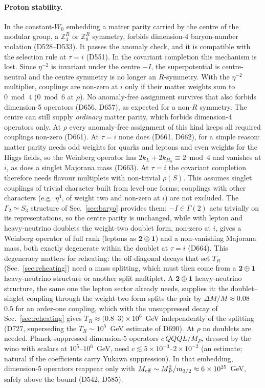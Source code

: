 \documentclass[aps,prd,twocolumn,superscriptaddress,nofootinbib,floatfix]{revtex4-2}
\begin{document}
\paragraph{Proton stability.} In the constant-$W_0$ embedding a matter parity carried by the centre of the modular group, a $\mathbb{Z}_4^R$ or $\mathbb{Z}_8^R$ symmetry, forbids dimension-4 baryon-number violation (D528--D533). It passes the anomaly check, and it is compatible with the selection rule at $\tau = i$ (D551). In the covariant completion this mechanism is lost. Since $\eta^{-2}$ is invariant under the centre $-I$, the superpotential is centre-neutral and the centre symmetry is no longer an $R$-symmetry. With the $\eta^{-2}$ multiplier, couplings are non-zero at $i$ only if their matter weights sum to $0\bmod4$ ($0\bmod6$ at $\rho$). No anomaly-free assignment survives that also forbids dimension-5 operators (D656, D657), as expected for a non-$R$ symmetry. The centre can still supply \emph{ordinary} matter parity, which forbids dimension-4 operators only. At $\rho$ every anomaly-free assignment of this kind keeps all required couplings non-zero (D661). At $\tau=i$ none does (D661, D662), for a simple reason: matter parity needs odd weights for quarks and leptons and even weights for the Higgs fields, so the Weinberg operator has $2k_L+2k_{H_u}\equiv2\bmod4$ and vanishes at $i$, as does a singlet Majorana mass (D663). At $\tau=i$ the covariant completion therefore needs flavour multiplets with non-trivial $\rho(S)$. This assumes singlet couplings of trivial character built from level-one forms; couplings with other characters (e.g.\ $\eta^4$, of weight two and non-zero at $i$) are not excluded. The $\Gamma_2\simeq S_3$ structure of Sec.~\ref{sec:baryo} provides them: $-I\in\Gamma(2)$ acts trivially on its representations, so the centre parity is unchanged, while with lepton and heavy-neutrino doublets the weight-two doublet form, non-zero at $i$, gives a Weinberg operator of full rank (leptons as $\mathbf2\oplus\mathbf1$) and a non-vanishing Majorana mass, both exactly degenerate within the doublet at $\tau=i$ (D664). This degeneracy matters for reheating: the off-diagonal decays that set $T_R$ (Sec.~\ref{sec:reheating}) need a mass splitting, which must then come from a $\mathbf2\oplus\mathbf1$ heavy-neutrino structure or another split multiplet. A $\mathbf2\oplus\mathbf1$ heavy-neutrino structure, the same one the lepton sector already needs, supplies it: the doublet--singlet coupling through the weight-two form splits the pair by $\Delta M/M\approx0.08$--$0.5$ for an order-one coupling, which with the unsuppressed decay of Sec.~\ref{sec:reheating} gives $T_R\approx(0.8$--$3)\times10^6$~GeV independently of the splitting (D727, superseding the $T_R\sim10^5$~GeV estimate of D690). At $\rho$ no doublets are needed. Planck-suppressed dimension-5 operators $c\,QQQL/M_P$, dressed by the wino with scalars at $10^5$--$10^6$~GeV, need $c\lesssim5\times10^{-3}$--$2\times10^{-2}$ (an estimate; natural if the coefficients carry Yukawa suppression). In that embedding, dimension-5 operators reappear only with $M_{\rm eff} \sim M_P^2/m_{3/2}\approx6\times10^{25}$~GeV, safely above the bound (D542, D585).
\end{document}
